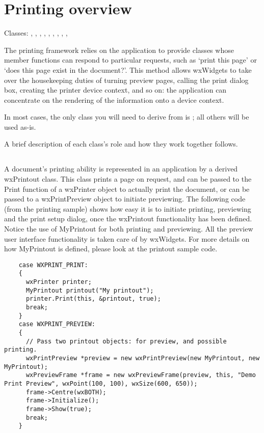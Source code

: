 \section{Printing overview}\label{printingoverview}

Classes: , 
, 
, 
, 
, 
, 
, 
, 
, 

The printing framework relies on the application to provide classes whose member
functions can respond to particular requests, such as `print this page' or `does
this page exist in the document?'. This method allows wxWidgets to take over the
housekeeping duties of turning preview pages, calling the print dialog box,
creating the printer device context, and so on: the application can concentrate
on the rendering of the information onto a device context.

In most cases, the only class you will need to derive from is
; all others will be used as-is.

A brief description of each class's role and how they work together follows.

\subsection{}

A document's printing ability is represented in an application by a derived
wxPrintout class. This class prints a page on request, and can be passed to the
Print function of a wxPrinter object to actually print the document, or can be
passed to a wxPrintPreview object to initiate previewing. The following code
(from the printing sample) shows how easy it is to initiate printing, previewing
and the print setup dialog, once the wxPrintout functionality has been defined.
Notice the use of MyPrintout for both printing and previewing. All the preview
user interface functionality is taken care of by wxWidgets. For more details on how
MyPrintout is defined, please look at the printout sample code.

\begin{verbatim}
    case WXPRINT_PRINT:
    {
      wxPrinter printer;
      MyPrintout printout("My printout");
      printer.Print(this, &printout, true);
      break;
    }
    case WXPRINT_PREVIEW:
    {
      // Pass two printout objects: for preview, and possible printing.
      wxPrintPreview *preview = new wxPrintPreview(new MyPrintout, new MyPrintout);
      wxPreviewFrame *frame = new wxPreviewFrame(preview, this, "Demo Print Preview", wxPoint(100, 100), wxSize(600, 650));
      frame->Centre(wxBOTH);
      frame->Initialize();
      frame->Show(true);
      break;
    }
\end{verbatim}

